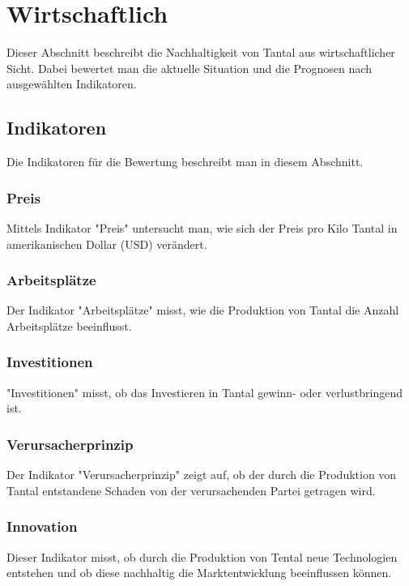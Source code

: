 \section{Wirtschaftlich}\label{sec:conflict}

Dieser Abschnitt beschreibt die Nachhaltigkeit von Tantal aus wirtschaftlicher Sicht. Dabei bewertet man die aktuelle
Situation und die Prognosen nach ausgewählten Indikatoren. 

\subsection{Indikatoren}

Die Indikatoren für die Bewertung beschreibt man in diesem Abschnitt.

\subsubsection{Preis}

Mittels Indikator "Preis" untersucht man, wie sich der Preis pro Kilo Tantal in amerikanischen
Dollar (USD) verändert.

\subsubsection{Arbeitsplätze}

Der Indikator "Arbeitsplätze" misst, wie die Produktion von Tantal die Anzahl Arbeitsplätze beeinflusst.

\subsubsection{Investitionen}

"Investitionen" misst, ob das Investieren in Tantal gewinn- oder verlustbringend ist.

\subsubsection{Verursacherprinzip}

Der Indikator "Verursacherprinzip" zeigt auf, ob der durch die Produktion von Tantal entstandene Schaden
von der verursachenden Partei getragen wird.

\subsubsection{Innovation}

Dieser Indikator misst, ob durch die Produktion von Tental neue Technologien entstehen und ob diese
nachhaltig die Marktentwicklung beeinflussen können.

